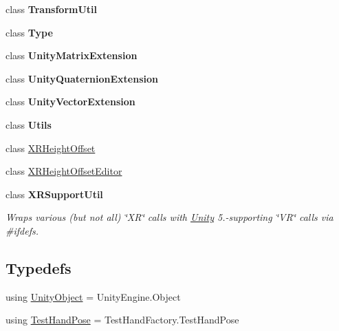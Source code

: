\begin{DoxyCompactItemize}
class {\bfseries Transform\+Util}
\item 
class {\bfseries Type}
\item 
class {\bfseries Unity\+Matrix\+Extension}
\item 
class {\bfseries Unity\+Quaternion\+Extension}
\item 
class {\bfseries Unity\+Vector\+Extension}
\item 
class {\bfseries Utils}
\item 
class \mbox{\hyperlink{class_leap_1_1_unity_1_1_x_r_height_offset}{X\+R\+Height\+Offset}}
\item 
class \mbox{\hyperlink{class_leap_1_1_unity_1_1_x_r_height_offset_editor}{X\+R\+Height\+Offset\+Editor}}
\item 
class {\bfseries X\+R\+Support\+Util}
\begin{DoxyCompactList}\small\item\em Wraps various (but not all) \char`\"{}\+X\+R\char`\"{} calls with \mbox{\hyperlink{namespace_leap_1_1_unity}{Unity}} 5.-\/supporting \char`\"{}\+V\+R\char`\"{} calls via \#ifdefs. \end{DoxyCompactList}\end{DoxyCompactItemize}
\subsection*{Typedefs}
\begin{DoxyCompactItemize}
\item 
using \mbox{\hyperlink{namespace_leap_1_1_unity_aa7911d55a8e7b4f29baff562ebffea48}{Unity\+Object}} = Unity\+Engine.\+Object
\item 
using \mbox{\hyperlink{namespace_leap_1_1_unity_acd6a6baee36c0cbe733c12b87791f963}{Test\+Hand\+Pose}} = Test\+Hand\+Factory.\+Test\+Hand\+Pose
\end{DoxyCompactItemize}
